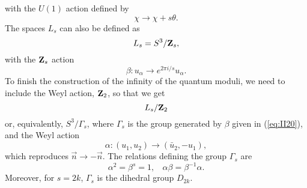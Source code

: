 with the $U(1)$ action defined by
\begin{equation}
\chi \rightarrow \chi + s \theta.
\label{eq:II18}
\end{equation}
The spaces $L_s$ can also be defined as
\begin{equation}
L_s = S^3/{\bf Z}_s,
\label{eq:II19}
\end{equation}
with the ${\bf Z}_s$ action
\begin{equation}
\beta : u_{\alpha} \rightarrow e^{2 \pi i/s} u_{\alpha}.
\label{eq:II20}
\end{equation}
To finish the construction of the infinity of the quantum moduli,
we need to include the Weyl action, ${\bf Z}_2$, so that we get
\begin{equation}
L_s/{\bf Z}_2
\label{eq:II21}
\end{equation}
or, equivalently, $S^3/\Gamma_s$, where $\Gamma_s$ is the group
generated by $\beta$ given in (\ref{eq:II20}), and the Weyl
action 
\begin{equation}
\alpha : (u_1,u_2) \rightarrow (\bar{u}_2, - u_1),
\label{eq:II22}
\end{equation}
which reproduces $\vec{n} \rightarrow - \vec{n}$. The relations
defining the group $\Gamma_s$ are
\begin{equation}
\alpha^2 = \beta^s = 1, \: \: \: \: \alpha \beta = \beta^{-1}
\alpha.
\label{eq:II23}
\end{equation}
Moreover, for $s=2k$, $\Gamma_s$ is the dihedral group $D_{2k}$.
  
